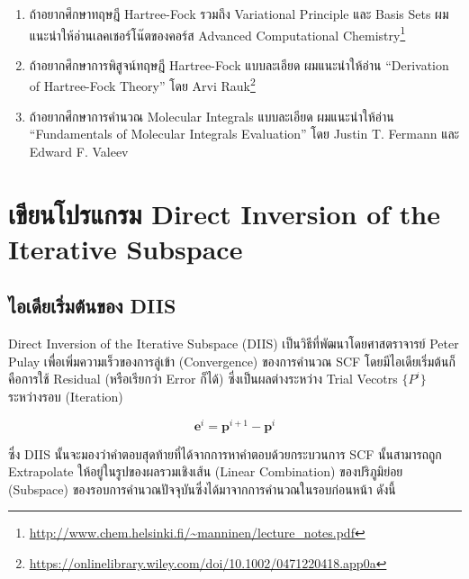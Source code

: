 \begin{enumerate}[topsep=0pt,noitemsep]
  \setlength\itemsep{1em}
  \item ถ้าอยากศึกษาทฤษฎี Hartree-Fock รวมถึง Variational Principle และ Basis Sets ผมแนะนำให้อ่านเลคเชอร์โน๊ตของคอร์ส
        Advanced Computational Chemistry\footnote{\url{http://www.chem.helsinki.fi/~manninen/lecture_notes.pdf}}

  \item ถ้าอยากศึกษาการพิสูจน์ทฤษฎี Hartree-Fock แบบละเอียด ผมแนะนำให้อ่าน \enquote{Derivation of Hartree-Fock Theory}
        โดย Arvi Rauk\footnote{\url{https://onlinelibrary.wiley.com/doi/10.1002/0471220418.app0a}}

  \item ถ้าอยากศึกษาการคำนวณ Molecular Integrals แบบละเอียด ผมแนะนำให้อ่าน \enquote{Fundamentals of Molecular
          Integrals Evaluation} โดย Justin T. Fermann และ Edward F. Valeev
\end{enumerate}

\section{เขียนโปรแกรม Direct Inversion of the Iterative Subspace}

\subsection{ไอเดียเริ่มต้นของ DIIS}

Direct Inversion of the Iterative Subspace (DIIS) เป็นวิธีที่พัฒนาโดยศาสตราจารย์ Peter Pulay เพื่อเพิ่มความเร็วของการลู่เข้า
(Convergence) ของการคำนวณ SCF\autocite{pulay1980} โดยมีไอเดียเริ่มต้นก็คือการใช้ Residual (หรือเรียกว่า Error ก็ได้)
ซึ่งเป็นผลต่างระหว่าง Trial Vecotrs $\{ P^{i}\}$ ระหว่างรอบ (Iteration)

\begin{equation}
  \mathbf{e}^i
  =
  \mathbf{p}^{i+1} - \mathbf{p}^i
\end{equation}

\noindent ซึ่ง DIIS นั้นจะมองว่าคำตอบสุดท้ายที่ได้จากการหาคำตอบด้วยกระบวนการ SCF นั้นสามารถถูก Extrapolate ให้อยู่ในรูปของผลรวมเชิงเส้น
(Linear Combination) ของปริภูมิย่อย (Subspace) ของรอบการคำนวณปัจจุบันซึ่งได้มาจากการคำนวณในรอบก่อนหน้า ดังนี้

